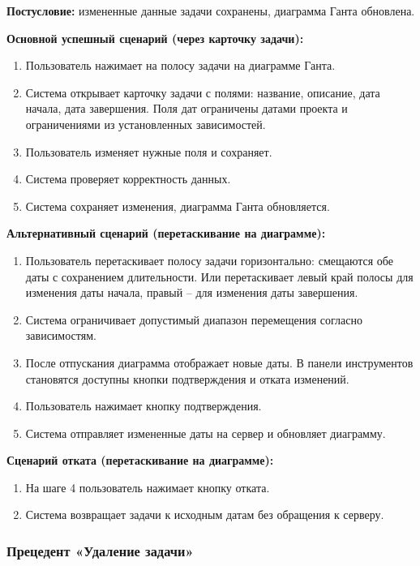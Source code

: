 \textbf{Постусловие:} измененные данные задачи сохранены, диаграмма Ганта обновлена.

\textbf{Основной успешный сценарий (через карточку задачи):}
\begin{enumerate}
    \item Пользователь нажимает на полосу задачи на диаграмме Ганта.
    \item Система открывает карточку задачи с полями: название, описание, дата начала, дата завершения. Поля дат ограничены датами проекта и ограничениями из установленных зависимостей.
    \item Пользователь изменяет нужные поля и сохраняет.
    \item Система проверяет корректность данных.
    \item Система сохраняет изменения, диаграмма Ганта обновляется.
\end{enumerate}

\textbf{Альтернативный сценарий (перетаскивание на диаграмме):}
\begin{enumerate}
    \item Пользователь перетаскивает полосу задачи горизонтально: смещаются обе даты с сохранением длительности. Или перетаскивает левый край полосы для изменения даты начала, правый -- для изменения даты завершения.
    \item Система ограничивает допустимый диапазон перемещения согласно зависимостям.
    \item После отпускания диаграмма отображает новые даты. В панели инструментов становятся доступны кнопки подтверждения и отката изменений.
    \item Пользователь нажимает кнопку подтверждения.
    \item Система отправляет измененные даты на сервер и обновляет диаграмму.
\end{enumerate}

\textbf{Сценарий отката (перетаскивание на диаграмме):}
\begin{enumerate}
    \item На шаге 4 пользователь нажимает кнопку отката.
    \item Система возвращает задачи к исходным датам без обращения к серверу.
\end{enumerate}

\subsubsection{Прецедент «Удаление задачи»}

